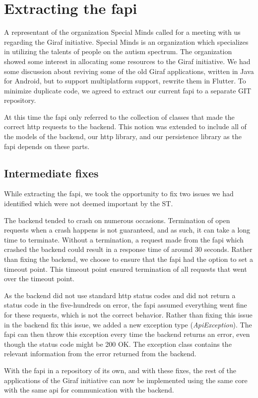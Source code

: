 \section{Extracting the \gls{fapi}}

A representant of the organization Special Minds called for a meeting with us regarding the Giraf initiative. Special Minds is an organization which specializes in utilizing the talents of people on the autism spectrum. The organization showed some interest in allocating some resources to the Giraf initiative. We had some discussion about reviving some of the old Giraf applications, written in Java for Android, but to support multiplatform support, rewrite them in Flutter. To minimize duplicate code, we agreed to extract our current \gls{fapi} to a separate GIT repository.

At this time the \gls{fapi} only referred to the collection of classes that made the correct \gls{http} requests to the backend. This notion was extended to include all of the models of the backend, our \gls{http} library, and our persistence library as the \gls{fapi} depends on these parts.

\subsection{Intermediate fixes}
While extracting the \gls{fapi}, we took the opportunity to fix two issues we had identified which were not deemed important by the \gls{ST}.

The backend tended to crash on numerous occasions. Termination of open requests when a crash happens is not guaranteed, and as such, it can take a long time to terminate. Without a termination, a request made from the \gls{fapi} which crashed the backend could result in a response time of around 30 seconds. Rather than fixing the backend, we choose to ensure that the \gls{fapi} had the option to set a timeout point. This timeout point ensured termination of all requests that went over the timeout point.

As the backend did not use standard \gls{http} status codes and did not return a status code in the five-hundreds on error, the \gls{fapi} assumed everything went fine for these requests, which is not the correct behavior. Rather than fixing this issue in the backend fix this issue, we added a new exception type (\textit{ApiException}). The \gls{fapi} can then throw this exception every time the backend returns an error, even though the status code might be 200 OK. The exception class contains the relevant information from the error returned from the backend.

With the \gls{fapi} in a repository of its own, and with these fixes, the rest of the applications of the Giraf initiative can now be implemented using the same core with the same \gls{api} for communication with the backend.